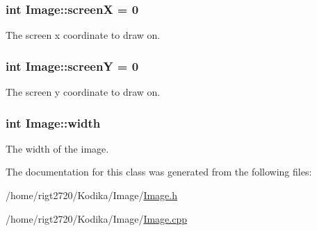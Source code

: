\hypertarget{classImage_a0488098c125477f82fc6ca8e14cc170f}{
\subsubsection[{screen\-X}]{\setlength{\rightskip}{0pt plus 5cm}int Image\-::screen\-X = 0}}\label{classImage_a0488098c125477f82fc6ca8e14cc170f}


The screen x coordinate to draw on. 

\hypertarget{classImage_a4c5bb89eba006c3768c2f36ef54d2c5b}{
\subsubsection[{screen\-Y}]{\setlength{\rightskip}{0pt plus 5cm}int Image\-::screen\-Y = 0}}\label{classImage_a4c5bb89eba006c3768c2f36ef54d2c5b}


The screen y coordinate to draw on. 

\hypertarget{classImage_ab8d12f635013c04159cd4d3d972bac88}{
\subsubsection[{width}]{\setlength{\rightskip}{0pt plus 5cm}int Image\-::width\hspace{0.3cm}{\ttfamily [protected]}}}\label{classImage_ab8d12f635013c04159cd4d3d972bac88}


The width of the image. 



The documentation for this class was generated from the following files\-:\begin{DoxyCompactItemize}
\item 
/home/rigt2720/\-Kodika/\-Image/\hyperlink{Image_8h}{Image.\-h}\item 
/home/rigt2720/\-Kodika/\-Image/\hyperlink{Image_8cpp}{Image.\-cpp}\end{DoxyCompactItemize}

